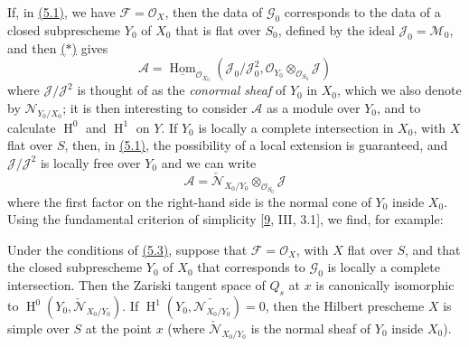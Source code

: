 \documentclass{article}
\newcommand{\oldpage}[1]{\marginpar{\footnotesize$\Big\vert$ \textit{p.~#1}}}
\theoremstyle{definition}
\theoremstyle{definition}
\theoremstyle{definition}
\theoremstyle{definition}
\theoremstyle{remark}
\begin{document}
If, in \protect\hyperlink{fga-3-iv-proposition-5.1}{(5.1)}, we have \({\mathscr{F}}={\mathscr{O}}_X\), then the data of \({\mathscr{G}}_0\) corresponds to the data of a closed subprescheme \(Y_0\) of \(X_0\) that is flat over \(S_0\), defined by the ideal \({\mathscr{J}}_0={\mathscr{M}}_0\), and then \protect\hyperlink{fga-3-iv-equation-asterisk}{(\(*\))} gives
\[
  {\mathscr{A}} = \underline{\operatorname{Hom}}_{{\mathscr{O}}_{X_0}}({\mathscr{J}}_0/{\mathscr{J}}_0^2,{\mathscr{O}}_{Y_0}\otimes_{{\mathscr{O}}_{S_0}}{\mathscr{J}})
\]
where \({\mathscr{J}}/{\mathscr{J}}^2\) is thought of as the \emph{conormal sheaf} of \(Y_0\) in \(X_0\), which we also denote by \({\mathscr{N}}_{Y_0/X_0}\);
\oldpage{221-23}it is then interesting to consider \({\mathscr{A}}\) as a module over \(Y_0\), and to calculate \(\operatorname{H}^0\) and \(\operatorname{H}^1\) on \(Y\).
If \(Y_0\) is locally a complete intersection in \(X_0\), with \(X\) flat over \(S\), then, in \protect\hyperlink{fga-3-iv-proposition-5.1}{(5.1)}, the possibility of a local extension is guaranteed, and \({\mathscr{J}}/{\mathscr{J}}^2\) is locally free over \(Y_0\) and we can write
\[
  {\mathscr{A}} = \check{{\mathscr{N}}}_{X_0/Y_0}\otimes_{{\mathscr{O}}_{S_0}}{\mathscr{J}}
\]
where the first factor on the right-hand side is the normal cone of \(Y_0\) inside \(X_0\).
Using the fundamental criterion of simplicity {[}\protect\hyperlink{ref-Gro1960b}{9}, III, 3.1{]}, we find, for example:

\leavevmode{}%
Under the conditions of \protect\hyperlink{fga-3-iv-corollary-5.3}{(5.3)}, suppose that \({\mathscr{F}}={\mathscr{O}}_X\), with \(X\) flat over \(S\), and that the closed subprescheme \(Y_0\) of \(X_0\) that corresponds to \({\mathscr{G}}_0\) is locally a complete intersection.
Then the Zariski tangent space of \(Q_s\) at \(x\) is canonically isomorphic to \(\operatorname{H}^0(Y_0,\check{{\mathscr{N}}}_{X_0/Y_0})\).
If \(\operatorname{H}^1(Y_0,\check{{\mathscr{N}}_{X_0/Y_0}})=0\), then the Hilbert prescheme \(X\) is simple over \(S\) at the point \(x\) (where \(\check{{\mathscr{N}}}_{X_0/Y_0}\) is the normal sheaf of \(Y_0\) inside \(X_0\)).
\end{document}
